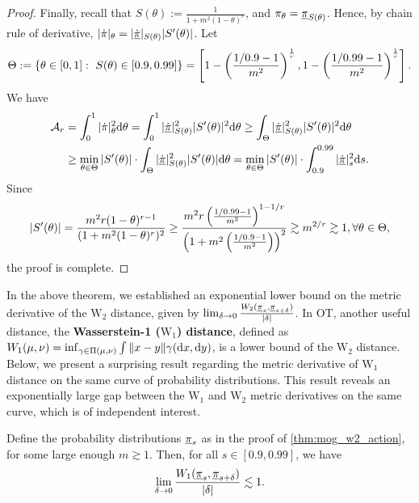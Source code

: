 \begin{proof}
Finally, recall that $S(\theta):=\frac{1}{1+m^2(1-\theta)^r}$, and $\pi_\theta=\underline{\pi}_{S(\theta)}$. Hence, by chain rule of derivative, $|\dot\pi|_\theta=|\dot{\underline{\pi}}|_{S(\theta)}|S'(\theta)|$. Let 
$$\Theta:=\{\theta\in[0,1]:~S(\theta)\in[0.9,0.99]\}=\left[1-\left(\frac{1/0.9-1}{m^2}\right)^{\frac1r},1-\left(\frac{1/0.99-1}{m^2}\right)^{\frac1r}\right].$$
We have
\begin{align*}
    \mathcal{A}_r&=\int_0^1|\dot\pi|_\theta^2\mathrm{d}\theta=\int_0^1|\dot{\underline{\pi}}|_{S(\theta)}^2|S'(\theta)|^2\mathrm{d}\theta\ge\int_\Theta|\dot{\underline{\pi}}|_{S(\theta)}^2|S'(\theta)|^2\mathrm{d}\theta\\
    &\ge\min_{\theta\in\Theta}|S'(\theta)|\cdot\int_\Theta|\dot{\underline{\pi}}|_{S(\theta)}^2|S'(\theta)|\mathrm{d}\theta=\min_{\theta\in\Theta}|S'(\theta)|\cdot\int_{0.9}^{0.99}|\dot{\underline{\pi}}|_s^2\mathrm{d} s.
\end{align*}
Since 
$$|S'(\theta)|=\frac{m^2r(1-\theta)^{r-1}}{(1+m^2(1-\theta)^r)^2}\ge\frac{m^2r\left(\frac{1/0.99-1}{m^2}\right)^{1-1/r}}{\left(1+m^2\left(\frac{1/0.9-1}{m^2}\right)\right)^2}\gtrsim m^{2/r}\gtrsim1,\forall \theta\in\Theta,$$
the proof is complete.
\end{proof}

\begin{remark}
    In the above theorem, we established an exponential lower bound on the metric derivative of the $\text{W}_\text{2}$ distance, given by $\lim_{\delta\to0}\frac{W_2(\underline{\pi}_s,\underline{\pi}_{s+\delta})}{|\delta|}$. In OT, another useful distance, the \textbf{Wasserstein-1 ($\text{W}_\text{1}$) distance}, defined as $W_1(\mu,\nu)=\inf_{\gamma\in\Pi(\mu,\nu)}\int\|x-y\|\gamma(\mathrm{d} x,\mathrm{d} y)$, is a lower bound of the $\text{W}_\text{2}$ distance. Below, we present a surprising result regarding the metric derivative of $\text{W}_\text{1}$ distance on the same curve of probability distributions. This result reveals an exponentially large gap between the $\text{W}_\text{1}$ and $\text{W}_\text{2}$ metric derivatives on the same curve, which is of independent interest. 
\end{remark}

\begin{theorem}
    Define the probability distributions $\underline{\pi}_s$ as in the proof of \cref{thm:mog_w2_action}, for some large enough $m\gtrsim1$. Then, for all $s\in[0.9,0.99]$, we have
    $$\lim_{\delta\to0}\frac{W_1(\underline{\pi}_s,\underline{\pi}_{s+\delta})}{|\delta|}\lesssim1.$$
    \label{thm:mog_w1_metder}
\end{theorem}

